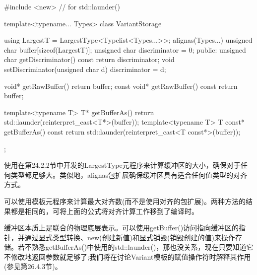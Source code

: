 \begin{cpp}
#include <new> // for std::launder()

template<typename... Types>
class VariantStorage {
	using LargestT = LargestType<Typelist<Types...>>;
	alignas(Types...) unsigned char buffer[sizeof(LargestT)];
	unsigned char discriminator = 0;
	public:
	unsigned char getDiscriminator() const { return discriminator; }
	void setDiscriminator(unsigned char d) { discriminator = d; }
	
	void* getRawBuffer() { return buffer; }
	const void* getRawBuffer() const { return buffer; }
	
	template<typename T>
		T* getBufferAs() { return std::launder(reinterpret_cast<T*>(buffer)); }
	template<typename T>
		T const* getBufferAs() const {
			return std::launder(reinterpret_cast<T const*>(buffer));
		}
};
\end{cpp}

使用在第24.2.2节中开发的LargestType元程序来计算缓冲区的大小，确保对于任何类型都足够大。类似地，alignas包扩展确保缓冲区具有适合任何值类型的对齐方式。

\begin{notice}
可以使用模板元程序来计算最大对齐数(而不是使用对齐的包扩展)。两种方法的结果都是相同的，可将上面的公式将对齐计算工作移到了编译时。
\end{notice}

缓冲区本质上是联合的物理底层表示。可以使用getBuffer()访问指向缓冲区的指针，并通过显式类型转换、new(创建新值)和显式销毁(销毁创建的值)来操作存储。若不熟悉getBufferAs()中使用的std::launder()，那也没关系，现在只要知道它不修改地返回参数就足够了;我们将在讨论Variant模板的赋值操作符时解释其作用(参见第26.4.3节)。






































